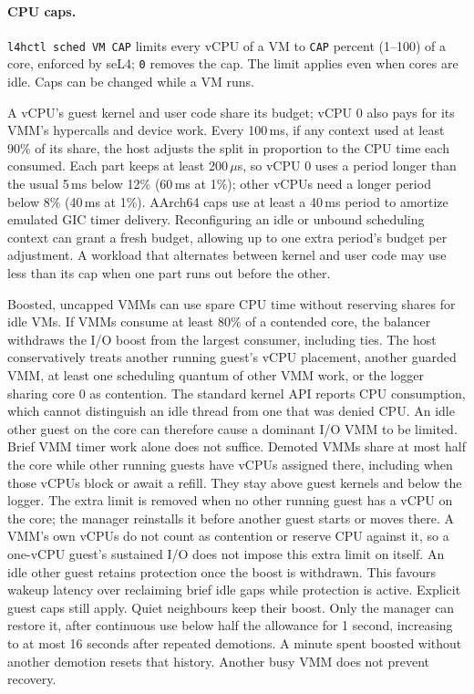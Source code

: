 \documentclass[11pt,a4paper]{report}
\newcommand{\cmd}[1]{\texttt{#1}}
\begin{document}
\paragraph{CPU caps.} \cmd{l4hctl sched VM CAP} limits every vCPU of a VM to
\texttt{CAP} percent (1--100) of a core, enforced by seL4; \texttt{0} removes
the cap. The limit applies even when cores are idle. Caps can be changed
while a VM runs.

A vCPU's guest kernel and user code share its budget; vCPU 0 also pays for
its VMM's hypercalls and device work. Every 100\,ms, if any context
used at least 90\% of its share, the host adjusts the split in
proportion to the CPU time each consumed. Each part keeps at least
200\,$\mu$s, so vCPU 0 uses a period longer than the usual 5\,ms below
12\% (60\,ms at 1\%); other vCPUs need a longer period below 8\%
(40\,ms at 1\%).
AArch64 caps use at least a 40\,ms period to
amortize emulated GIC timer delivery. Reconfiguring an idle or unbound scheduling context can
grant a fresh budget, allowing up to one extra period's budget per
adjustment. A workload that alternates between kernel and user code may
use less than its cap when one part runs out before the other.

Boosted, uncapped VMMs can use spare CPU time without reserving shares
for idle VMs. If VMMs consume at least 80\% of a contended core, the balancer
withdraws the I/O boost from the largest consumer, including ties.
The host conservatively treats another running guest's vCPU placement,
another guarded VMM, at least one scheduling quantum of other VMM work,
or the logger sharing core 0 as contention. The standard kernel API reports
CPU consumption, which cannot distinguish an idle thread from one that
was denied CPU. An idle other guest on the core can therefore cause a
dominant I/O VMM to be limited. Brief VMM timer work alone does not suffice.
Demoted VMMs share at most half the core while other running guests have
vCPUs assigned there, including when those vCPUs block or await a refill.
They stay above guest kernels and below the logger. The extra limit is
removed when no other running guest has a vCPU on the core; the manager
reinstalls it before another guest starts or moves there. A VMM's own
vCPUs do not count as contention or reserve CPU against it, so a
one-vCPU guest's sustained I/O does not impose this extra limit on itself.
An idle other guest retains protection once the boost is withdrawn.
This favours wakeup latency over reclaiming brief idle gaps while
protection is active.
Explicit guest caps still apply. Quiet neighbours keep their boost.
Only the manager can restore it, after continuous use below half the
allowance for 1 second, increasing to at most 16 seconds after repeated
demotions. A minute spent boosted without another demotion resets that
history. Another busy VMM does not prevent recovery.
\end{document}
